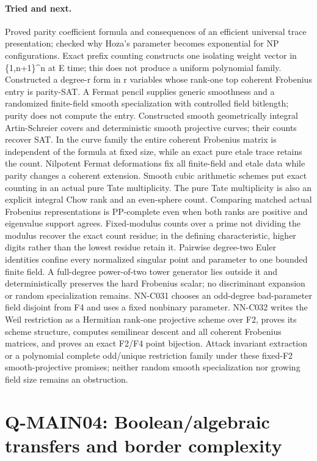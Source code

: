 \paragraph{Tried and next.} Proved parity coefficient formula and consequences of an efficient universal trace presentation; checked why Hoza's parameter becomes exponential for NP configurations. Exact prefix counting constructs one isolating weight vector in \{1,n+1\}\textasciicircum{}n at E time; this does not produce a uniform polynomial family. Constructed a degree-r form in r variables whose rank-one top coherent Frobenius entry is parity-SAT. A Fermat pencil supplies generic smoothness and a randomized finite-field smooth specialization with controlled field bitlength; purity does not compute the entry. Constructed smooth geometrically integral Artin-Schreier covers and deterministic smooth projective curves; their counts recover SAT. In the curve family the entire coherent Frobenius matrix is independent of the formula at fixed size, while an exact pure etale trace retains the count. Nilpotent Fermat deformations fix all finite-field and etale data while parity changes a coherent extension. Smooth cubic arithmetic schemes put exact counting in an actual pure Tate multiplicity. The pure Tate multiplicity is also an explicit integral Chow rank and an even-sphere count. Comparing matched actual Frobenius representations is PP-complete even when both ranks are positive and eigenvalue support agrees. Fixed-modulus counts over a prime not dividing the modulus recover the exact count residue; in the defining characteristic, higher digits rather than the lowest residue retain it. Pairwise degree-two Euler identities confine every normalized singular point and parameter to one bounded finite field. A full-degree power-of-two tower generator lies outside it and deterministically preserves the hard Frobenius scalar; no discriminant expansion or random specialization remains. NN-C031 chooses an odd-degree bad-parameter field disjoint from F4 and uses a fixed nonbinary parameter. NN-C032 writes the Weil restriction as a Hermitian rank-one projective scheme over F2, proves its scheme structure, computes semilinear descent and all coherent Frobenius matrices, and proves an exact F2/F4 point bijection. Attack invariant extraction or a polynomial complete odd/unique restriction family under these fixed-F2 smooth-projective promises; neither random smooth specialization nor growing field size remains an obstruction.

\section{Q-MAIN04: Boolean/algebraic transfers and border complexity}
